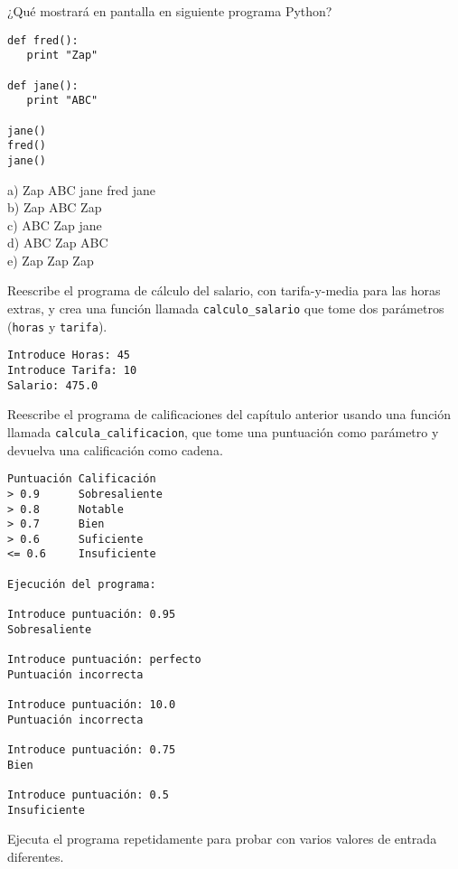 \begin{ex}
¿Qué mostrará en pantalla en siguiente programa Python?

\beforeverb
\begin{verbatim}
def fred():
   print "Zap"

def jane():
   print "ABC"

jane()
fred()
jane()
\end{verbatim}
\afterverb
%
a) Zap ABC jane fred jane\\
b) Zap ABC Zap\\
c) ABC Zap jane\\
d) ABC Zap ABC\\
e) Zap Zap Zap
\end{ex}

\begin{ex}
Reescribe el programa de cálculo del salario, con tarifa-y-media para las horas extras,
y crea una función llamada \verb"calculo_salario" que tome
dos parámetros ({\tt horas} y {\tt tarifa}).

\begin{verbatim}
Introduce Horas: 45
Introduce Tarifa: 10
Salario: 475.0
\end{verbatim}
\end{ex}

\begin{ex}
Reescribe el programa de calificaciones del capítulo anterior
usando una función llamada \verb"calcula_calificacion", que tome
una puntuación como parámetro y devuelva una calificación como cadena.

\begin{verbatim}
Puntuación Calificación
> 0.9      Sobresaliente
> 0.8      Notable
> 0.7      Bien
> 0.6      Suficiente
<= 0.6     Insuficiente

Ejecución del programa:

Introduce puntuación: 0.95
Sobresaliente

Introduce puntuación: perfecto
Puntuación incorrecta

Introduce puntuación: 10.0
Puntuación incorrecta

Introduce puntuación: 0.75
Bien

Introduce puntuación: 0.5
Insuficiente
\end{verbatim}

Ejecuta el programa repetidamente para probar con varios valores
de entrada diferentes.
\end{ex}
